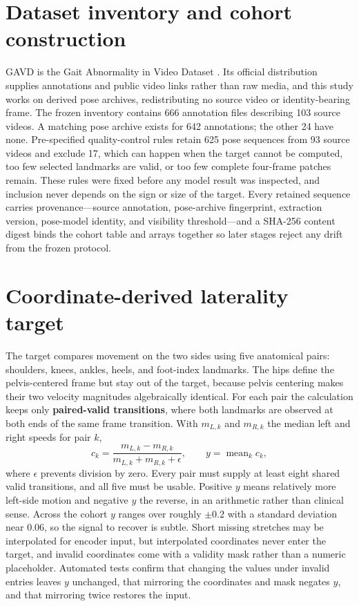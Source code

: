\documentclass{article}
\begin{document}
\section{Dataset inventory and cohort construction}

GAVD is the Gait Abnormality in Video Dataset \citep{ranjan2025gavd,gavdRepo2026}. Its official distribution supplies annotations and public video links rather than raw media, and this study works on derived pose archives, redistributing no source video or identity-bearing frame. The frozen inventory contains 666 annotation files describing 103 source videos. A matching pose archive exists for 642 annotations; the other 24 have none. Pre-specified quality-control rules retain 625 pose sequences from 93 source videos and exclude 17, which can happen when the target cannot be computed, too few selected landmarks are valid, or too few complete four-frame patches remain. These rules were fixed before any model result was inspected, and inclusion never depends on the sign or size of the target. Every retained sequence carries provenance---source annotation, pose-archive fingerprint, extraction version, pose-model identity, and visibility threshold---and a SHA-256 content digest binds the cohort table and arrays together so later stages reject any drift from the frozen protocol.

\section{Coordinate-derived laterality target}

The target compares movement on the two sides using five anatomical pairs: shoulders, knees, ankles, heels, and foot-index landmarks. The hips define the pelvis-centered frame but stay out of the target, because pelvis centering makes their two velocity magnitudes algebraically identical. For each pair the calculation keeps only \textbf{paired-valid transitions}, where both landmarks are observed at both ends of the same frame transition. With $m_{L,k}$ and $m_{R,k}$ the median left and right speeds for pair $k$,
\[
c_k=\frac{m_{L,k}-m_{R,k}}{m_{L,k}+m_{R,k}+\epsilon},
\qquad y=\operatorname{mean}_k c_k,
\]
where $\epsilon$ prevents division by zero. Every pair must supply at least eight shared valid transitions, and all five must be usable. Positive $y$ means relatively more left-side motion and negative $y$ the reverse, in an arithmetic rather than clinical sense. Across the cohort $y$ ranges over roughly $\pm0.2$ with a standard deviation near $0.06$, so the signal to recover is subtle. Short missing stretches may be interpolated for encoder input, but interpolated coordinates never enter the target, and invalid coordinates come with a validity mask rather than a numeric placeholder. Automated tests confirm that changing the values under invalid entries leaves $y$ unchanged, that mirroring the coordinates and mask negates $y$, and that mirroring twice restores the input.
\end{document}
